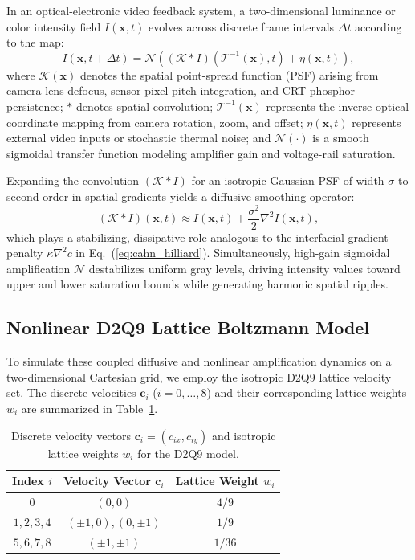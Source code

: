\documentclass[aps,pre,twocolumn,showpacs,superscriptaddress,floatfix]{revtex4-2}
\begin{document}
In an optical-electronic video feedback system, a two-dimensional luminance or color intensity field $I(\bm{x}, t)$ evolves across discrete frame intervals $\Delta t$ according to the map:
\begin{equation}
I(\bm{x}, t + \Delta t) = \mathcal{N}\left( (\mathcal{K} * I)(\mathcal{T}^{-1}(\bm{x}), t) + \eta(\bm{x}, t) \right),
\label{eq:video_feedback}
\end{equation}
where $\mathcal{K}(\bm{x})$ denotes the spatial point-spread function (PSF) arising from camera lens defocus, sensor pixel pitch integration, and CRT phosphor persistence; $*$ denotes spatial convolution; $\mathcal{T}^{-1}(\bm{x})$ represents the inverse optical coordinate mapping from camera rotation, zoom, and offset; $\eta(\bm{x}, t)$ represents external video inputs or stochastic thermal noise; and $\mathcal{N}(\cdot)$ is a smooth sigmoidal transfer function modeling amplifier gain and voltage-rail saturation.

Expanding the convolution $(\mathcal{K} * I)$ for an isotropic Gaussian PSF of width $\sigma$ to second order in spatial gradients yields a diffusive smoothing operator:
\begin{equation}
(\mathcal{K} * I)(\bm{x}, t) \approx I(\bm{x}, t) + \frac{\sigma^2}{2} \nabla^2 I(\bm{x}, t),
\label{eq:psf_expansion}
\end{equation}
which plays a stabilizing, dissipative role analogous to the interfacial gradient penalty $\kappa \nabla^2 c$ in Eq.~(\ref{eq:cahn_hilliard}). Simultaneously, high-gain sigmoidal amplification $\mathcal{N}$ destabilizes uniform gray levels, driving intensity values toward upper and lower saturation bounds while generating harmonic spatial ripples.

\subsection{Nonlinear D2Q9 Lattice Boltzmann Model}

To simulate these coupled diffusive and nonlinear amplification dynamics on a two-dimensional Cartesian grid, we employ the isotropic D2Q9 lattice velocity set. The discrete velocities $\bm{c}_i$ ($i = 0, \dots, 8$) and their corresponding lattice weights $w_i$ are summarized in Table~\ref{tab:d2q9_params}.

\begin{table}[t]
\caption{Discrete velocity vectors $\bm{c}_i = (c_{ix}, c_{iy})$ and isotropic lattice weights $w_i$ for the D2Q9 model.}
\label{tab:d2q9_params}
\begin{ruledtabular}
\begin{tabular}{ccc}
Index $i$ & Velocity Vector $\bm{c}_i$ & Lattice Weight $w_i$ \\
\hline
$0$ & $(0, 0)$ & $4/9$ \\
$1, 2, 3, 4$ & $(\pm 1, 0), (0, \pm 1)$ & $1/9$ \\
$5, 6, 7, 8$ & $(\pm 1, \pm 1)$ & $1/36$ \\
\end{tabular}
\end{ruledtabular}
\end{table}
\end{document}
